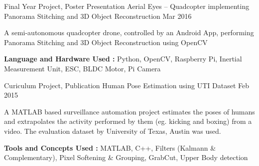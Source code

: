 

\begin{cventries}
  \cventry
    {Final Year Project, Poster Presentation} %
    {Aerial Eyes – Quadcopter implementing Panorama Stitching and 3D Object Reconstruction} %
    {} %
    {Mar 2016} %
    {
      \begin{cvitems}
      \item{A semi-autonomous quadcopter drone, controlled by an Android App, performing Panorama Stitching and 3D Object Reconstruction using OpenCV}
      \item{\textbf{Language and Hardware Used :} Python, OpenCV, Raspberry Pi, Inertial Measurement Unit, ESC, BLDC Motor, Pi Camera}
      \end{cvitems}
    }

  \cventry
    {Curiculum Project, Publication} %
    {Human Pose Estimation using UTI Dataset} %
    {} %
    {Feb 2015} %
    {
      \begin{cvitems}
      \item{A MATLAB based surveillance automation project estimates the poses of humans and extrapolates the activity performed by them (eg. kicking and boxing) from a video. The evaluation dataset by University of Texas, Austin was used.}
      \item{\textbf{Tools and Concepts Used :} MATLAB, C++, Filters (Kalmann \& Complementary), Pixel Softening \& Grouping, GrabCut, Upper Body detection}
      \end{cvitems}
    }


\end{cventries}
